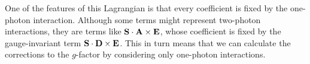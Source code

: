 One of the features of this Lagrangian is that every coefficient is fixed by the one-photon interaction.  Although some terms might represent two-photon interactions, they are terms like $\mathbf{S} \cdot \mathbf{A} \times \mathbf{E}$, whose coefficient is fixed by the gauge-invariant term $\mathbf{S} \cdot \mathbf{D} \times \mathbf{E}$.  This in turn means that we can calculate the corrections to the $g$-factor by considering only one-photon interactions.




